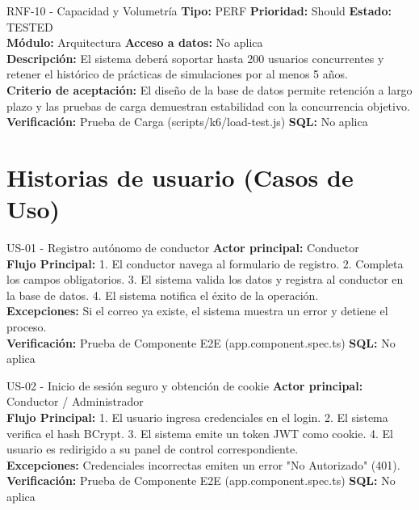 \documentclass[11pt,a4paper]{article}
\begin{document}
\begin{requisito}{RNF-10 - Capacidad y Volumetría}
    \textbf{Tipo:} PERF \quad \textbf{Prioridad:} Should \quad \textbf{Estado:} TESTED \\[0.2cm]
    \textbf{Módulo:} Arquitectura \quad \textbf{Acceso a datos:} No aplica \\[0.2cm]
    \textbf{Descripción:} El sistema deberá soportar hasta 200 usuarios concurrentes y retener el histórico de prácticas de simulaciones por al menos 5 años. \\[0.2cm]
    \textbf{Criterio de aceptación:} El diseño de la base de datos permite retención a largo plazo y las pruebas de carga demuestran estabilidad con la concurrencia objetivo. \\[0.2cm]
    \textbf{Verificación:} Prueba de Carga (scripts/k6/load-test.js) \quad \textbf{SQL:} No aplica
\end{requisito}


\newpage
\section{Historias de usuario (Casos de Uso)}

\begin{requisito}{US-01 - Registro autónomo de conductor}
    \textbf{Actor principal:} Conductor\\[0.2cm]
    \textbf{Flujo Principal:} 1. El conductor navega al formulario de registro. 2. Completa los campos obligatorios. 3. El sistema valida los datos y registra al conductor en la base de datos. 4. El sistema notifica el éxito de la operación. \\[0.2cm]
    \textbf{Excepciones:} Si el correo ya existe, el sistema muestra un error y detiene el proceso.\\[0.2cm]
    \textbf{Verificación:} Prueba de Componente E2E (app.component.spec.ts) \quad \textbf{SQL:} No aplica
\end{requisito}

\begin{requisito}{US-02 - Inicio de sesión seguro y obtención de cookie}
    \textbf{Actor principal:} Conductor / Administrador\\[0.2cm]
    \textbf{Flujo Principal:} 1. El usuario ingresa credenciales en el login. 2. El sistema verifica el hash BCrypt. 3. El sistema emite un token JWT como cookie. 4. El usuario es redirigido a su panel de control correspondiente. \\[0.2cm]
    \textbf{Excepciones:} Credenciales incorrectas emiten un error "No Autorizado" (401).\\[0.2cm]
    \textbf{Verificación:} Prueba de Componente E2E (app.component.spec.ts) \quad \textbf{SQL:} No aplica
\end{requisito}
\end{document}
